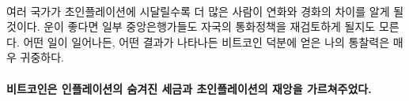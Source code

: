 \paragraph{}
\begin{comment}
As more and more countries suffer from
hyperinflation more and more people will have to face the reality
of hard and soft money. If we are lucky, maybe even some central bankers will be
forced to re-evaluate their monetary policies. Whatever might happen, the
insights I have gained thanks to Bitcoin will probably be invaluable, no matter
the outcome.
\end{comment}
여러 국가가 초인플레이션에 시달릴수록 더 많은 사람이 연화와 경화의 차이를 알게 될 것이다. 
운이 좋다면 일부 중앙은행가들도 자국의 통화정책을 재검토하게 될지도 모른다. 
어떤 일이 일어나든, 어떤 결과가 나타나든
비트코인 덕분에 얻은 나의 통찰력은 매우 귀중하다.

\paragraph{비트코인은 인플레이션의 숨겨진 세금과 초인플레이션의 재앙을 가르쳐주었다.}

%
%
%
%
%
